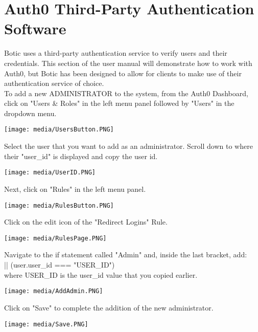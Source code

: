 \documentclass[11pt]{article}
\begin{document}
\section{Auth0 Third-Party Authentication Software}
\begin{flushleft}
	Botic uses a third-party authentication service to verify users and their credentials. This section of the user manual will demonstrate how to work with Auth0, but Botic has been designed to allow for clients to make use of their authentication service of choice.\\[0.5cm]
	To add a new ADMINISTRATOR to the system, from the Auth0 Dashboard, click on "Users \& Roles" in the left menu panel followed by "Users" in the dropdown menu.\\[0.5cm]
\end{flushleft}
\texttt{[image: media/UsersButton.PNG]}
\begin{flushleft}
	Select the user that you want to add as an administrator. Scroll down to where their "user\_id" is displayed and copy the user id.\\[0.5cm]
\end{flushleft}
\texttt{[image: media/UserID.PNG]}
\begin{flushleft}
        Next, click on "Rules" in the left menu panel.\\[0.5cm]
\end{flushleft}
\texttt{[image: media/RulesButton.PNG]}
\begin{flushleft}
    Click on the edit icon of the "Redirect Logins" Rule.\\[0.5cm]
\end{flushleft}	
\texttt{[image: media/RulesPage.PNG]}
\begin{flushleft}
    Navigate to the if statement called "Admin" and, inside the last bracket, add:\\[0.5cm]
	 || (user.user\_id === "USER\_ID")\\[0.5cm]
	where USER\_ID is the user\_id value that you copied earlier.\\[0.5cm]
\end{flushleft}
\texttt{[image: media/AddAdmin.PNG]}
\begin{flushleft}
	Click on "Save" to complete the addition of the new administrator.\\[0.5cm]
\end{flushleft}
\texttt{[image: media/Save.PNG]}
\end{document}
